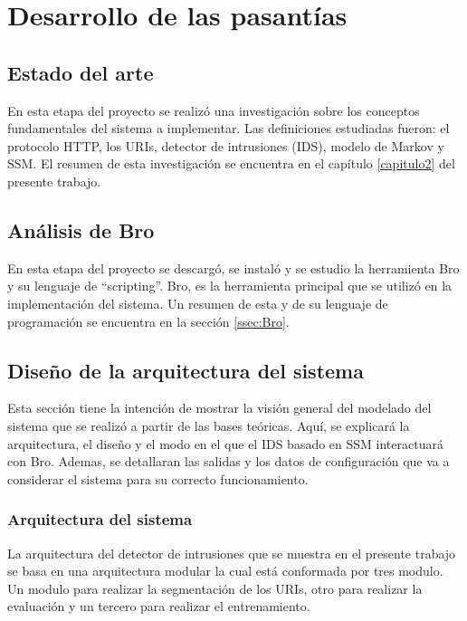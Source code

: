 \chapter{Desarrollo de las pasantías}
\label{capitulo3}

\section{Estado del arte}

En esta etapa del proyecto se realizó una investigación sobre los conceptos fundamentales del sistema a implementar. Las definiciones estudiadas fueron: el protocolo HTTP, los URIs, detector de intrusiones (IDS), modelo de Markov y SSM.
El resumen de esta investigación se encuentra en el capítulo \ref{capitulo2} del presente trabajo.

\section{Análisis de Bro}

En esta etapa del proyecto se descargó, se instaló y se estudio la herramienta Bro y su lenguaje de ``scripting''. Bro, es la herramienta principal que se utilizó en la implementación del sistema. Un resumen de esta y de su lenguaje de programación se encuentra en la sección \ref{ssec:Bro}.

\section{Diseño de la arquitectura del sistema}

Esta sección tiene la intención de mostrar la visión general del modelado del sistema que se realizó a partir de las bases teóricas. Aquí, se explicará la arquitectura, el diseño y el modo en el que el IDS basado en SSM interactuará con Bro. Ademas, se detallaran las salidas y los datos de configuración
que va a considerar el sistema para su correcto funcionamiento.

\subsection{Arquitectura del sistema}

La arquitectura del detector de intrusiones que se muestra en el presente trabajo se basa en una arquitectura modular la cual está conformada por tres modulo. Un modulo para realizar la segmentación de los URIs, otro  para realizar la evaluación y un tercero para realizar el entrenamiento.

